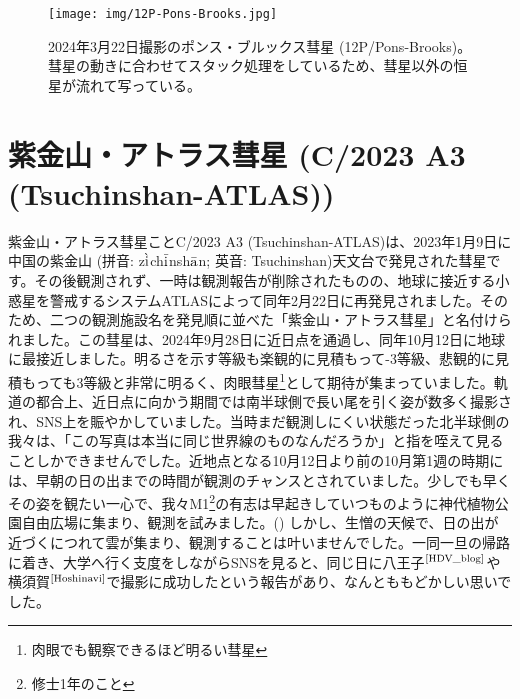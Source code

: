 \documentclass[../../super_nova_2024]{subfiles}
\begin{document}
\begin{figure}[H]
  \centering
  \texttt{[image: img/12P-Pons-Brooks.jpg]}
  \caption{2024年3月22日撮影のポンス・ブルックス彗星 (12P/Pons-Brooks)。彗星の動きに合わせてスタック処理をしているため、彗星以外の恒星が流れて写っている。}
  \label{fig:Pons-Brooks}
\end{figure}

\section{紫金山・アトラス彗星 (C/2023 A3 (Tsuchinshan-ATLAS))}

紫金山・アトラス彗星ことC/2023 A3 (Tsuchinshan-ATLAS)は、2023年1月9日に中国の紫金山 (拼音: z$\Grave{\textrm{{i}}}$ch$\Bar{\textrm{{i}}}$nsh$\Bar{\textrm{{a}}}$n; 英音: Tsuchinshan)天文台で発見された彗星です。その後観測されず、一時は観測報告が削除されたものの、地球に接近する小惑星を警戒するシステムATLASによって同年2月22日に再発見されました。そのため、二つの観測施設名を発見順に並べた「紫金山・アトラス彗星」と名付けられました。この彗星は、2024年9月28日に近日点を通過し、同年10月12日に地球に最接近しました。明るさを示す等級も楽観的に見積もって-3等級、悲観的に見積もっても3等級と非常に明るく、肉眼彗星\footnote{肉眼でも観察できるほど明るい彗星}として期待が集まっていました。軌道の都合上、近日点に向かう期間では南半球側で長い尾を引く姿が数多く撮影され、SNS上を賑やかしていました。当時まだ観測しにくい状態だった北半球側の我々は、「この写真は本当に同じ世界線のものなんだろうか」と指を咥えて見ることしかできませんでした。近地点となる10月12日より前の10月第1週の時期には、早朝の日の出までの時間が観測のチャンスとされていました。少しでも早くその姿を観たい一心で、我々M1\footnote{修士1年のこと}の有志は早起きしていつものように神代植物公園自由広場に集まり、観測を試みました。() しかし、生憎の天候で、日の出が近づくにつれて雲が集まり、観測することは叶いませんでした。一同一旦の帰路に着き、大学へ行く支度をしながらSNSを見ると、同じ日に八王子$^\text{\cite{HDV_blog}}$や横須賀$^\text{\cite{Hoshinavi}}$で撮影に成功したという報告があり、なんとももどかしい思いでした。
\end{document}
